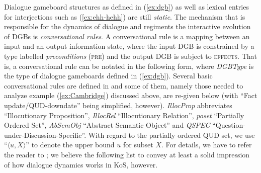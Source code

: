 \documentclass[output=paper,biblatex,babelshorthands,newtxmath,draftmode,colorlinks,citecolor=brown]{langscibook}
\begin{document}
Dialogue gameboard structures as defined in (\ref{ex:dgb}) as well as lexical entries for interjections such as (\ref{ex:ehh-hehh}) are still \emph{static}.
%
The mechanism that is responsible for the dynamics of dialogue and regiments the interactive evolution of DGBs is \emph{conversational rules}.
%
A conversational rule is a mapping between an input and an output information state, where the input DGB is constrained by a type labelled \emph{preconditions} (\textsc{pre}) and the output DGB is subject to \textsc{effects}.
%
That is, a conversational rule can be notated in the following form, where \emph{DGBType} is the type of dialogue gameboards defined in (\ref{ex:dgb}).
%
\ea \label{ex:pre-effect}
\z
%
Several basic conversational rules are defined in \citet[Chapter~4]{Ginzburg:2012} and some of them, namely those needed to analyze example (\ref{ex:Cambridge}) discussed above, are re-given below (with \enquote{Fact update/QUD-downdate} being simplified, however).
%
\textit{IllocProp} abbreviates \enquote{Illocutionary Proposition}, \textit{IllocRel} \enquote{Illocutionary Relation}, \textit{poset} \enquote{Partially Ordered Set}, \textit{AbSemObj} \enquote{Abstract Semantic Object} and \textit{QSPEC} \enquote{Question-under-Discussion-Specific}.
%
With regard to the partially ordered QUD set, we use \enquote{$\langle u, X\rangle$} to denote the upper bound $u$ for subset $X$.
%
For details, we have to refer the reader to \citet{Ginzburg:2012}; we believe the following list to convey at least a solid impression of how dialogue dynamics works in KoS, however.
%
\end{document}
